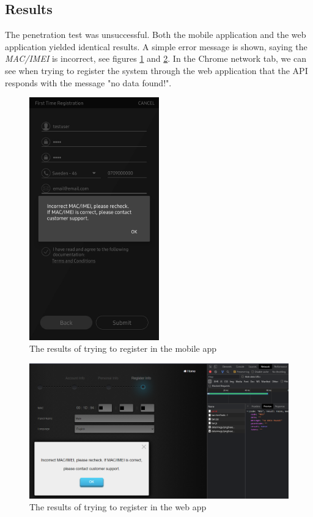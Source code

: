 \subsection{Results}
The penetration test was unsuccessful. Both the mobile application and the web application yielded identical results. A simple error message is shown, saying the \textit{MAC/IMEI} is incorrect, see figures \ref{fig:vesta-home-registration-failed} and \ref{fig:vesta-web-registration-failed}. In the Chrome network tab, we can see when trying to register the system through the web application that the API responds with the message "no data found!".
\begin{figure}[!ht]
    \centering
    \includegraphics[width=0.5\textwidth]{images/6-pentesting/vesta-home-registration-failed.jpg}
    \caption{The results of trying to register in the mobile app}
    \label{fig:vesta-home-registration-failed}
\end{figure}
\begin{figure}[!ht]
    \centering
    \includegraphics[width=\textwidth]{images/6-pentesting/vesta-web-registration-failed.png}
    \caption{The results of trying to register in the web app}
    \label{fig:vesta-web-registration-failed}
\end{figure}

